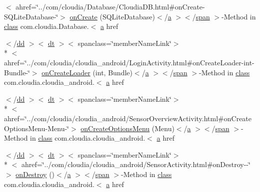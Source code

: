 \begin{DoxyCompactItemize}
$<$ ahref=\char`\"{}../com/cloudia/Database/Cloudia\-D\-B.\-html\#on\-Create-\/S\-Q\-Lite\-Database-\/\char`\"{}$>$ \hyperlink{index-13_8html_acd43c15853c51df577eca825417795d5}{on\-Create} (S\-Q\-Lite\-Database)$<$/\hyperlink{style_8css_a5e8981582017bb8b84c21f148345d1f7}{a} $>$$<$/\hyperlink{stylesheet_8css_a8343996ebcf16220b04e54659aac31cc}{span} $>$-\/Method in \hyperlink{_tools_8html_acf06f836132665ba8114f5a414c2403f}{class} com.\-cloudia.\-Database.$<$ \hyperlink{style_8css_a5e8981582017bb8b84c21f148345d1f7}{a} href
\item 
$<$/\hyperlink{stylesheet_8css_a47f4718a86835a7771ec592ece845221}{dd} $>$$<$ \hyperlink{stylesheet_8css_a107565fb4039d33b041380d6e0ea1d80}{dt} $>$$<$ spanclass=\char`\"{}member\-Name\-Link\char`\"{}$>$\\*
$<$ ahref=\char`\"{}../com/cloudia/cloudia\-\_\-android/Login\-Activity.\-html\#on\-Create\-Loader-\/int-\/Bundle-\/\char`\"{}$>$ \hyperlink{index-13_8html_aee88eba3a1977a80ac96db027333ae49}{on\-Create\-Loader} (int, Bundle)$<$/\hyperlink{style_8css_a5e8981582017bb8b84c21f148345d1f7}{a} $>$$<$/\hyperlink{stylesheet_8css_a8343996ebcf16220b04e54659aac31cc}{span} $>$-\/Method in \hyperlink{_tools_8html_acf06f836132665ba8114f5a414c2403f}{class} com.\-cloudia.\-cloudia\-\_\-android.$<$ \hyperlink{style_8css_a5e8981582017bb8b84c21f148345d1f7}{a} href
\item 
$<$/\hyperlink{stylesheet_8css_a47f4718a86835a7771ec592ece845221}{dd} $>$$<$ \hyperlink{stylesheet_8css_a107565fb4039d33b041380d6e0ea1d80}{dt} $>$$<$ spanclass=\char`\"{}member\-Name\-Link\char`\"{}$>$\\*
$<$ ahref=\char`\"{}../com/cloudia/cloudia\-\_\-android/Sensor\-Overview\-Activity.\-html\#on\-Create\-Options\-Menu-\/Menu-\/\char`\"{}$>$ \hyperlink{index-13_8html_a96b77eefe935dd33e8be2f1a26fcd2b6}{on\-Create\-Options\-Menu} (Menu)$<$/\hyperlink{style_8css_a5e8981582017bb8b84c21f148345d1f7}{a} $>$$<$/\hyperlink{stylesheet_8css_a8343996ebcf16220b04e54659aac31cc}{span} $>$-\/Method in \hyperlink{_tools_8html_acf06f836132665ba8114f5a414c2403f}{class} com.\-cloudia.\-cloudia\-\_\-android.$<$ \hyperlink{style_8css_a5e8981582017bb8b84c21f148345d1f7}{a} href
\item 
$<$/\hyperlink{stylesheet_8css_a47f4718a86835a7771ec592ece845221}{dd} $>$$<$ \hyperlink{stylesheet_8css_a107565fb4039d33b041380d6e0ea1d80}{dt} $>$$<$ spanclass=\char`\"{}member\-Name\-Link\char`\"{}$>$\\*
$<$ ahref=\char`\"{}../com/cloudia/cloudia\-\_\-android/Sensor\-Activity.\-html\#on\-Destroy-\/-\/\char`\"{}$>$ \hyperlink{index-13_8html_ae795cfd9113c4283f5336808d5da5bf6}{on\-Destroy} ()$<$/\hyperlink{style_8css_a5e8981582017bb8b84c21f148345d1f7}{a} $>$$<$/\hyperlink{stylesheet_8css_a8343996ebcf16220b04e54659aac31cc}{span} $>$-\/Method in \hyperlink{_tools_8html_acf06f836132665ba8114f5a414c2403f}{class} com.\-cloudia.\-cloudia\-\_\-android.$<$ \hyperlink{style_8css_a5e8981582017bb8b84c21f148345d1f7}{a} href

\end{DoxyCompactItemize}

